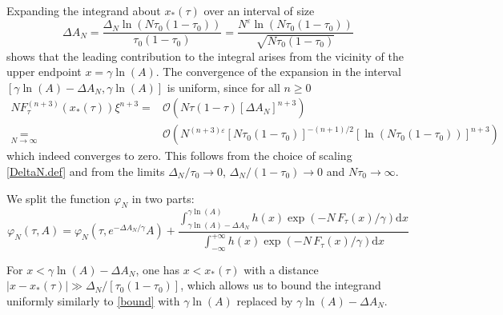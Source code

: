 \documentclass[pdflatex,sn-mathphys-num]{sn-jnl}
\theoremstyle{thmstyleone}
\numberwithin{equation}{section}
\begin{document}
Expanding the integrand about $x_*(\tau)$ over an interval of size
\begin{equation}
\Delta A_N=\frac{\Delta_N\ln(N\tau_0(1-\tau_0))}{\tau_0(1-\tau_0)}=\frac{N^\varepsilon\ln(N\tau_0(1-\tau_0))}{\sqrt{N\tau_0(1-\tau_0)}}
\end{equation}
shows that the leading contribution to the integral arises from the vicinity of the upper endpoint $x=\gamma\ln(A)$. The convergence of the expansion in the interval $[\gamma\ln(A)-\Delta A_N,\gamma\ln(A)]$ is uniform, since for all $n\geq 0$
\begin{equation}
\begin{split}
NF_\tau^{(n+3)}(x_*(\tau))\xi^{n+3}=&\mathcal{O}(N\tau(1-\tau)[\Delta A_N]^{n+3})\\
\underset{N\to\infty}{=}&\mathcal{O}(N^{(n+3)\varepsilon}[N\tau_0(1-\tau_0)]^{-(n+1)/2}[\ln(N\tau_0(1-\tau_0))]^{n+3})
\end{split}
\end{equation}
which indeed converges to zero. This follows from the choice of scaling \eqref{DeltaN.def} and from the limits $\Delta_N/\tau_0\to0$, $\Delta_N/(1-\tau_0)\to0$ and $N\tau_0\to\infty$.


We split the function $\varphi_{N}$ in two parts:
\begin{equation}
\varphi_N(\tau,A)=\varphi_N(\tau,e^{-\Delta A_N/\gamma}A)+\frac{\int_{\gamma\ln(A)-\Delta A_N}^{\gamma\ln(A)}h\left( x \right)\exp\left( -N\,F_{\tau}\left( x \right)/\gamma \right)\mathrm{d}x}{\int_{-\infty}^{+\infty}h\left( x \right)\exp\left( -N\,F_{\tau}\left( x \right)/\gamma \right)\mathrm{d}x}
\end{equation}

\noindent For $x<\gamma\ln(A)-\Delta A_N$, one has $x<x_*(\tau)$ with a distance $|x-x_*(\tau)|\gg\Delta_N/[\tau_0(1-\tau_0)]$, which allows us to bound the integrand uniformly similarly to \eqref{bound} with $\gamma \ln(A)$ replaced by $\gamma\ln(A)-\Delta A_N$. 
\end{document}
